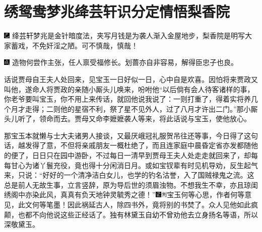 

\chapter{绣鸳鸯梦兆绛芸轩\hspace{.5em}识分定情悟梨香院}

{\includegraphics[width=3mm]{../Images/00003}  \kaishu 绛芸轩梦兆是金针暗度法，夹写月钱是为袭人渐入金屋地步，梨香院是明写大家蓄戏，不免奸淫之陋。可不慎哉，慎哉！}

{\includegraphics[width=3mm]{../Images/00005}  \kaishu 造物何尝作主张，任人禀受福修长。划蔷亦自非容易，解得臣忠子也良。}

话说贾母自王夫人处回来，见宝玉一日好似一日，心中自是欢喜。因怕将来贾政又叫他，遂命人将贾政的亲随小厮头儿唤来，吩咐他“以后倘有会人待客诸样的事，你老爷要叫宝玉，你不用上来传话，就回他说我说了：一则打重了，得着实将养几个月才走得；二则他的星宿不利，祭了星不见外人，过了八月才许出二门。”那小厮头儿听了，领命而去。贾母又命李嬷嬷袭人等来，将此话说与宝玉，使他放心。

那宝玉本就懒与士大夫诸男人接谈，又最厌峨冠礼服贺吊往还等事，今日得了这句话，越发得了意，不但将亲戚朋友一概杜绝了，而且连家庭中晨昏定省亦发都随他的便了，日日只在园中游卧，不过每日一清早到贾母王夫人处走走就回来了，却每每甘心为诸丫鬟充役，竟也得十分闲消日月。或如宝钗辈有时见机导劝，反生起气来，只说：“好好的一个清净洁白女儿，也学的钓名沽誉，入了国贼禄鬼之流。这总是前人无故生事，立言竖辞，原为导后世的须眉浊物。不想我生不幸，亦且琼闺绣阁中亦染此风，真真有负天地钟灵毓秀之德！”{\includegraphics[width=3mm]{../Images/00006}\includegraphics[width=3mm]{../Images/00011}\footnotesize \kaishu 宝玉何等心思，作者何等意见，此文何等笔墨！}因此祸延古人，除四书外，竟将别的书焚了。众人见他如此疯颠，也都不向他说这些正经话了。独有林黛玉自幼不曾劝他去立身扬名等语，所以深敬黛玉。

